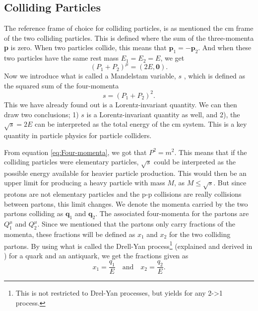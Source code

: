 \documentclass[a4paper, american, 12pt]{report}
\begin{document}
	\subsection{Colliding Particles}
	\label{subsect:Theory-Part_colliding}
	The reference frame of choice for colliding particles, is as mentioned the \acrshort{cm} frame of the two colliding particles. This is defined where the sum of the three-momenta \textbf{p} is zero. When two particles collide, this means that $\textbf{p}_1=-\textbf{p}_2$. And when these two particles have the same rest mass $E_1=E_2=E$, we get
	\begin{equation}
	\label{eq:Four-mom_equal_E}
		(P_1+P_2)^{\mu}=(2E,\textbf{0}).
	\end{equation}
	Now we introduce what is called a Mandelstam variable\cite{thomson2013modern}, $s$ , which is defined as the squared sum of the four-momenta
	\begin{equation}
	\label{eq:Mandel_var_s}
		s=(P_1+P_2)^2.
	\end{equation}
	This we have already found out is a Lorentz-invariant quantity. We can then draw two conclusions; 1) $s$ is a Lorentz-invariant quantity as well, and 2), the $\sqrt{s}=2E$ can be interpreted as the total energy of the \acrshort{cm} system. This is a key quantity in particle physics for particle colliders.

	From equation \ref{eq:Four-momenta}, we got that $P^2=m^2$. This means that if the colliding particles were elementary particles, $\sqrt{s}$ could be interpreted as the possible energy available for heavier particle production. This would then be an upper limit for producing a heavy particle with mass $M$, as $M\leq\sqrt{s}$. But since protons are not elementary particles and the p-p collisions are really collisions between partons, this limit changes. We denote the momenta carried by the two partons colliding as $\textbf{q}_1$ and $\textbf{q}_2$. The associated four-momenta for the partons are $Q_1^{\mu}$ and $Q_2^{\mu}$. Since we mentioned that the partons only carry fractions of the momenta, these fractions will be defined as $x_1$ and $x_2$ for the two colliding partons. By using what is called the Drell-Yan process\footnote{This is not restricted to Drel-Yan processes, but yields for any 2->1 process.} (explained and derived in \citet{thomson2013modern}) for a quark and an antiquark, we get the fractions given as
	\begin{equation}
	\label{eq:Drell-Yan_fractions}
		x_1=\frac{q_1}{E}\quad \text{and}\quad x_2=\frac{q_2}{E}.
	\end{equation}
\end{document}
